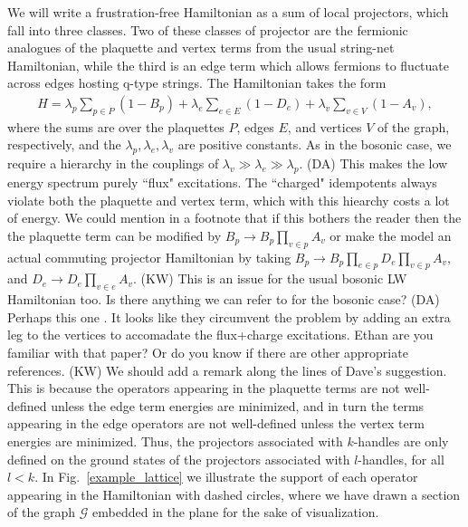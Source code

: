 \documentclass[12pt,a4paper]{article}
\newcounter{arrow}
\newcommand{\mcz}{\mathcal{Z}}
\newcommand{\mcg}{\mathcal{G}}
\newcommand{\dave}[1]{{\color{ao(english)}\footnotesize{(DA) #1}}}
\newcommand{\ethan}[1]{{\color{amethyst}\footnotesize{(EL) #1}}}
\newcommand{\kw}[1]{{\color{kwcolor}\footnotesize{(KW) #1}}}
\begin{document}
We will write a frustration-free Hamiltonian as a sum of local projectors, which fall into
three classes.
Two of these classes of projector are the fermionic analogues of the plaquette and vertex terms from the usual string-net Hamiltonian, 
while the third is an edge term which allows fermions to fluctuate across edges hosting q-type strings.
The Hamiltonian takes the form
\begin{align} \label{ham}
H = \lambda_p \sum_{p \in P} (1-B_p) + \lambda_e \sum_{e \in E} (1-D_e) + \lambda_v \sum_{v \in V} (1-A_v),
\end{align}
where the sums are over the plaquettes $P$, edges $E$, and vertices $V$ of the graph, respectively, and the $\lambda_p,\lambda_e,\lambda_v$ are positive constants.
As in the bosonic case, we require a hierarchy in the couplings of $\lambda_v \gg \lambda_e \gg \lambda_p$.
\dave{This makes the low energy spectrum purely ``flux" excitations. 
The ``charged" idempotents always violate both the plaquette and vertex term, which with this hiearchy costs a lot of energy. 
We could mention in a footnote that if this bothers the reader then the the plaquette term can be modified by $B_p \rightarrow B_p \prod_{v \in p} A_v$ or make the model an actual commuting projector Hamiltonian by taking $B_p \rightarrow B_p \prod_{e \in p} D_e \prod_{v \in p} A_v$, and $D_e \rightarrow D_e \prod_{v \in e} A_v$. }
\kw{This is an issue for the usual bosonic LW Hamiltonian too.
Is there anything we can refer to for the bosonic case?}
\dave{Perhaps this one \cite{hu2015}. 
It looks like they circumvent the problem by adding an extra leg to the vertices to accomadate the flux+charge excitations.
Ethan are you familiar with that paper? Or do you know if there are other appropriate references.}
\kw{We should add a remark along the lines of Dave's suggestion.}
This is because the operators appearing in the plaquette terms are not well-defined unless the edge term energies are minimized, and in turn the terms appearing in the edge operators are not well-defined unless the vertex term energies are minimized.
Thus, the projectors associated with $k$-handles are only defined on the ground states of the projectors associated with $l$-handles, for all $l<k$.  
In Fig.~\ref{example_lattice} we illustrate the support of each operator appearing in the Hamiltonian with dashed circles, where we have drawn a section of the graph $\mcg$ embedded in the plane for the sake of visualization. 
\end{document}
